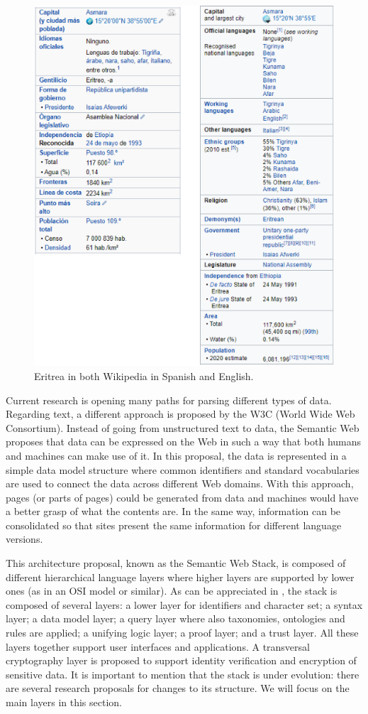 \begin{figure}[!ht]
    \centering
        \includegraphics[width=.8\linewidth]{imagenes/EritreaWikipedia.png}
        \caption{Eritrea in both Wikipedia in Spanish and English.}
        \label{fig:eritreaWikipedia}
\end{figure}

Current research is opening many paths for parsing different types of data. Regarding text, a different approach is proposed by the W3C (World Wide Web Consortium). Instead of going from unstructured text to data, the Semantic Web proposes that data can be expressed on the Web in such a way that both humans and machines can make use of it. In this proposal, the data is represented in a simple data model structure where common identifiers and standard vocabularies are used to connect the data across different Web domains. With this approach, pages (or parts of pages) could be generated from data and machines would have a better grasp of what the contents are. In the same way, information can be consolidated so that sites present the same information for different language versions.

This architecture proposal, known as the Semantic Web Stack, is composed of different hierarchical language layers where higher layers are supported by lower ones (as in an OSI model or similar). As can be appreciated in , the stack is composed of several layers: a lower layer for identifiers and character set; a syntax layer; a data model layer; a query layer where also taxonomies, ontologies and rules are applied; a unifying logic layer; a proof layer; and a trust layer. All these layers together support user interfaces and applications. A transversal cryptography layer is proposed to support identity verification and encryption of sensitive data. It is important to mention that the stack is under evolution: there are several research proposals for changes to its structure. We will focus on the main layers in this section.

